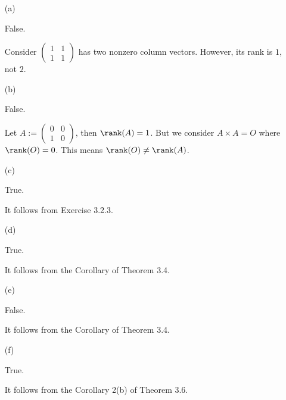 \begin{Exercise}
\begin{enumerate}[(a)]
\item[(a)]
\begin{answer}
False.
\end{answer}
\begin{solution}
Consider $\begin{pmatrix}
1 & 1 \\
1 & 1
\end{pmatrix}$ has two nonzero column vectors. However, its rank is $1$, not $2$.
\end{solution}

\item[(b)]
\begin{answer}
False.
\end{answer}
\begin{solution}
Let $A := \begin{pmatrix}
0 & 0 \\
1 & 0
\end{pmatrix}$, then $\rank(A) = 1$. But we consider $A\times A = O$ where $\rank(O) = 0$. This means $\rank(O)\neq \rank(A)$.
\end{solution}

\item[(c)]
\begin{answer}
True.
\end{answer}
\begin{solution}
It follows from Exercise 3.2.3.
\end{solution}

\item[(d)]
\begin{answer}
True.
\end{answer}
\begin{solution}
It follows from the Corollary of Theorem 3.4.
\end{solution}

\item[(e)]
\begin{answer}
False.
\end{answer}
\begin{solution}
It follows from the Corollary of Theorem 3.4.
\end{solution}

\item[(f)]
\begin{answer}
True.
\end{answer}
\begin{solution}
It follows from the Corollary 2(b) of Theorem 3.6.
\end{solution}


\end{enumerate}
\end{Exercise}
